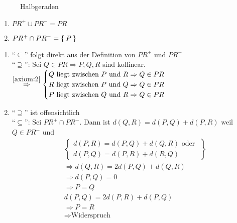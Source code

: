 \begin{figure}[htp]
    \centering
    
    \caption{Halbgeraden}
    \label{fig:halbgeraden}
\end{figure}

\begin{korollar}
    \begin{enumerate}[label=(\roman*)]
        \item $PR^+ \cup PR^- = PR$
        \item $PR^+ \cap PR^- = \Set{P}$
    \end{enumerate}
\end{korollar}

\begin{beweis}\leavevmode
    \begin{enumerate}[label=(\roman*)]
        \item \enquote{$\subseteq$} folgt direkt aus der Definition von $PR^+$ und $PR^-$\\
              \enquote{$\supseteq$}: Sei $Q \in PR \Rightarrow P, Q, R$ 
              sind kollinear.\\
              $\overset{\ref{axiom:2}}{\Rightarrow}
              \begin{cases} 
                Q \text{ liegt zwischen } P \text{ und } R \Rightarrow Q \in PR\\
                R \text{ liegt zwischen } P \text{ und } Q \Rightarrow Q \in PR\\
                P \text{ liegt zwischen } Q \text{ und } R \Rightarrow Q \in PR
              \end{cases}$
        \item \enquote{$\supseteq$} ist offensichtlich\\
              \enquote{$\subseteq$}: Sei $PR^+ \cap PR^-$. Dann ist
              $d(Q,R) = d(P,Q) + d(P,R)$ weil $Q \in PR^-$ und
              \begin{align*}
                &\left \{ \begin{array}{l}
                        d(P,R) = d(P,Q) + d(Q,R) \text{ oder }\\
                        d(P,Q) = d(P,R) + d(R,Q)
                       \end{array} \right \}\\
                &\Rightarrow d(Q,R) = 2d(P,Q) + d(Q,R)\\
                &\Rightarrow d(P,Q) = 0\\
                &\Rightarrow P=Q\\
                &d(P,Q) = 2d(P,R) + d(P,Q)\\
                &\Rightarrow P=R\\
                &\Rightarrow \text{Widerspruch}
              \end{align*}
    \end{enumerate}
\end{beweis}

